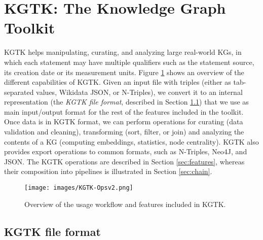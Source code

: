 \documentclass[runningheads]{llncs}
\newcommand{\kibitz}[2]{%
{\color{#1}#2}{}%
}
\newcommand{\pedro}[1]{\kibitz{orange}{[PS: #1]}} %
\newcommand{\DG}[1]{\kibitz{red}{[DG: #1]}} %
\begin{document}


\section{KGTK: The Knowledge Graph Toolkit}\label{sec:kgtk} 

KGTK helps manipulating, curating, and analyzing large real-world KGs, in which each statement may have multiple qualifiers such as the statement source, its creation date or its measurement units. Figure \ref{fig:overview} shows an overview of the different capabilities of KGTK. Given an input file with triples (either as tab-separated values, Wikidata JSON, or N-Triples), we convert it to an internal representation (the \textit{KGTK file format}, described in Section \ref{sec:format}) that we use as main input/output format for the rest of the features included in the toolkit. Once data is in KGTK format, we can perform operations for curating (data validation and cleaning), transforming (sort, filter, or join) and analyzing the contents of a KG (computing embeddings, statistics, node centrality). KGTK also provides export operations to common formats, such as N-Triples, Neo4J, and JSON. 
The KGTK operations are described in Section \ref{sec:features}, whereas their composition into pipelines is illustrated in Section \ref{sec:chain}.
\begin{figure}[t!]
    \centering
    \texttt{[image: images/KGTK-Opsv2.png]}
    \caption{Overview of the usage workflow and features included in KGTK.}
    \label{fig:overview}
\end{figure}

\subsection{KGTK file format}\label{sec:format}
\label{ssec:kgtk-format}

\end{document}
